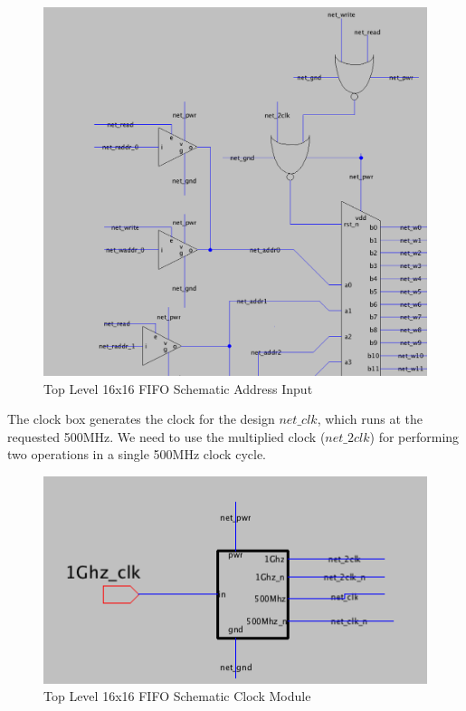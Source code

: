 \documentclass[a4paper]{article}
\begin{document}
\begin{figure}[H]
	\centering
	\includegraphics[scale=0.3]{topLevelSchematicLeft}
	\caption{Top Level 16x16 FIFO Schematic Address Input}
	\label{fig:topLevelSchematicLeft}
\end{figure}

The clock box generates the clock for the design $net\_clk$, which runs at the requested 500MHz. We need to use the multiplied clock ($net\_2clk$) for performing two operations in a single 500MHz clock cycle. 

\begin{figure}[H]
	\centering
	\includegraphics[scale=0.65]{topLevelSchematicClockBox}
	\caption{Top Level 16x16 FIFO Schematic Clock Module}
	\label{fig:topLevelSchematicClockBox}
\end{figure}
\end{document}
